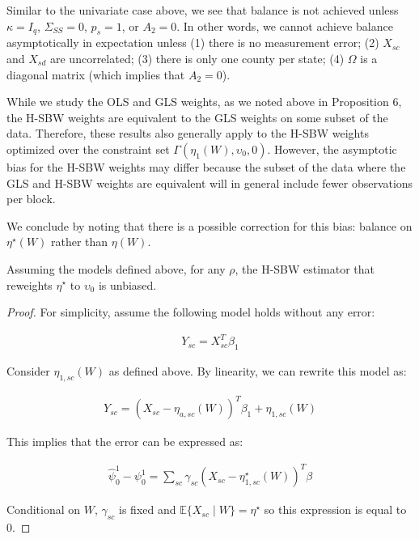 \begin{remark}
Similar to the univariate case above, we see that balance is not achieved unless $\kappa = I_q$, $\Sigma_{SS} = 0$, $p_s = 1$, or $A_2 = 0$. In other words, we cannot achieve balance asymptotically in expectation unless (1) there is no measurement error; (2) $X_{sc}$ and $X_{sd}$ are uncorrelated; (3) there is only one county per state; (4) $\Omega$ is a diagonal matrix (which implies that $A_2 = 0$).
\end{remark}

\begin{remark}
While we study the OLS and GLS weights, as we noted above in Proposition 6, the H-SBW weights are equivalent to the GLS weights on some subset of the data. Therefore, these results also generally apply to the H-SBW weights optimized over the constraint set $\Gamma(\eta_1(W), \upsilon_0, 0)$. However, the asymptotic bias for the H-SBW weights may differ because the subset of the data where the GLS and H-SBW weights are equivalent will in general include fewer observations per block. 
\end{remark}

We conclude by noting that there is a possible correction for this bias: balance on $\eta^\star(W)$ rather than $\eta(W)$. 

\begin{proposition}
    Assuming the models defined above, for any $\rho$, the H-SBW estimator that reweights $\eta^\star$ to $\upsilon_0$ is unbiased.
\end{proposition}

\begin{proof}
    For simplicity, assume the following model holds without any error:
    
    \begin{align*}
        Y_{sc} = X_{sc}^T\beta_1
    \end{align*}
    
    Consider $\eta_{1, sc}(W)$ as defined above. By linearity, we can rewrite this model as:
    
    \begin{align*}
        Y_{sc} = (X_{sc} - \eta_{a, sc}(W))^T\beta_1 + \eta_{1, sc}(W)
    \end{align*}
    
    This implies that the error can be expressed as:
    
    \begin{align*}
        \hat{\psi}^1_0 - \psi^1_0 = \sum_{sc}\gamma_{sc}(X_{sc} - \eta^\star_{1, sc}(W))^T\beta
    \end{align*}
    
    Conditional on $W$, $\gamma_{sc}$ is fixed and $\mathbb{E}\{X_{sc} \mid W\} = \eta^\star$ so this expression is equal to 0.
\end{proof}

